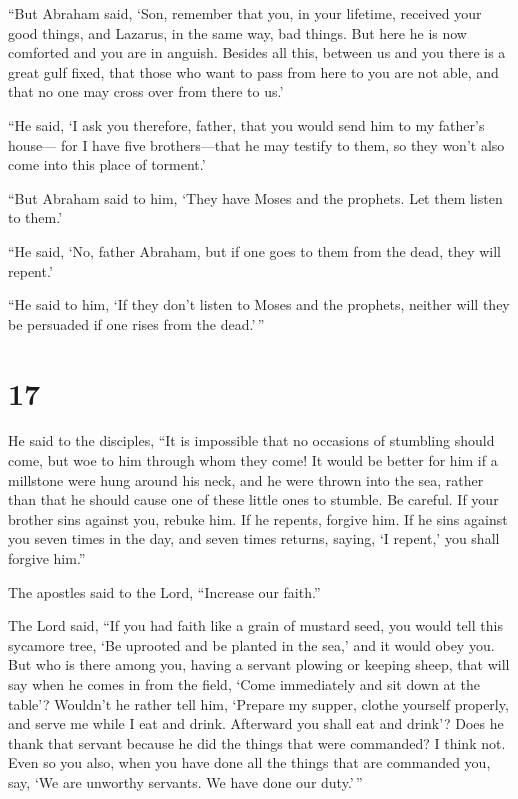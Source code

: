  ``But Abraham said, `Son, remember that you, in your
lifetime, received your good things, and Lazarus, in the same way, bad
things. But here he is now comforted and you are in anguish.
 Besides all this, between us and you there is a great gulf
fixed, that those who want to pass from here to you are not able, and
that no one may cross over from there to us.'

 ``He said, `I ask you therefore, father, that you would
send him to my father's house---  for I have five
brothers---that he may testify to them, so they won't also come into
this place of torment.'

 ``But Abraham said to him, `They have Moses and the
prophets. Let them listen to them.'

 ``He said, `No, father Abraham, but if one goes to them
from the dead, they will repent.'

 ``He said to him, `If they don't listen to Moses and the
prophets, neither will they be persuaded if one rises from the
dead.'\,''

\hypertarget{section-16}{%
\section{17}\label{section-16}}

 He said to the disciples, ``It is impossible that no
occasions of stumbling should come, but woe to him through whom they
come!  It would be better for him if a millstone were hung
around his neck, and he were thrown into the sea, rather than that he
should cause one of these little ones to stumble.  Be
careful. If your brother sins against you, rebuke him. If he repents,
forgive him.  If he sins against you seven times in the day,
and seven times returns, saying, `I repent,' you shall forgive him.''

 The apostles said to the Lord, ``Increase our faith.''

 The Lord said, ``If you had faith like a grain of mustard
seed, you would tell this sycamore tree, `Be uprooted and be planted in
the sea,' and it would obey you.  But who is there among
you, having a servant plowing or keeping sheep, that will say when he
comes in from the field, `Come immediately and sit down at the table'?
 Wouldn't he rather tell him, `Prepare my supper, clothe
yourself properly, and serve me while I eat and drink. Afterward you
shall eat and drink'?  Does he thank that servant because he
did the things that were commanded? I think not.  Even so
you also, when you have done all the things that are commanded you, say,
`We are unworthy servants. We have done our duty.'\,''

